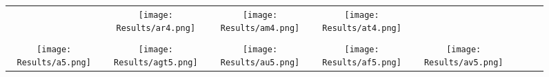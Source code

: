 \documentclass[journal]{IEEEtran}
\begin{document}
\begin{figure*}[!t]
\begin{tabular}{cccccccc}
		&
		\hspace{0.4cm}
		\begin{minipage}{30pt}
			\texttt{[image: Results/ar4.png]}
\end{minipage}
		&
		\hspace{0.4cm}
		\begin{minipage}{30pt}
			\texttt{[image: Results/am4.png]}
\end{minipage}
		&
		\hspace{0.4cm}
		\begin{minipage}{30pt}
			\texttt{[image: Results/at4.png]}
\end{minipage}
		\\
		\\
		\begin{minipage}{30pt}
			\texttt{[image: Results/a5.png]}
\end{minipage}
		&
		\hspace{0.4cm}
		\begin{minipage}{30pt}
			\texttt{[image: Results/agt5.png]}
\end{minipage}
		&
		\hspace{0.4cm}
		\begin{minipage}{30pt}
			\texttt{[image: Results/au5.png]}
\end{minipage}
		&
		\hspace{0.4cm}
		\begin{minipage}{30pt}
			\texttt{[image: Results/af5.png]}
\end{minipage}
		&
		\hspace{0.4cm}
		\begin{minipage}{30pt}
			\texttt{[image: Results/av5.png]}
\end{minipage}
	

\end{tabular}
\end{figure*}
\end{document}

